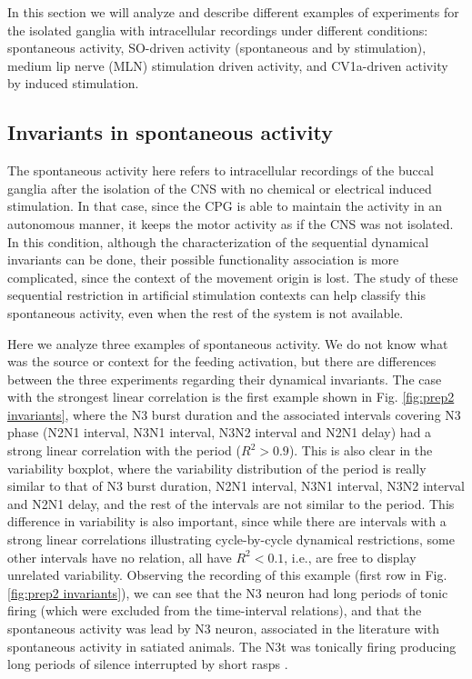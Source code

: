 
In this section we will analyze and describe different examples of experiments for the isolated ganglia with intracellular recordings under different conditions: spontaneous activity, SO-driven activity (spontaneous and by stimulation), medium lip nerve (MLN) stimulation driven activity, and CV1a-driven activity by induced stimulation.

\subsection{Invariants in spontaneous activity}
The spontaneous activity here refers to intracellular recordings of the buccal ganglia after the isolation of the CNS with no chemical or electrical induced stimulation. In that case, since the CPG is able to maintain the activity in an autonomous manner, it keeps the motor activity as if the CNS was not isolated. In this condition, although the characterization of the sequential dynamical invariants can be done, their possible functionality association is more complicated, since the context of the movement origin is lost. The study of these sequential restriction in artificial stimulation contexts can help classify this spontaneous activity, even when the rest of the system is not available. 

Here we analyze three examples of spontaneous activity. We do not know what was the source or context for the feeding activation, but there are differences between the three experiments regarding their dynamical invariants. The case with the strongest linear correlation is the first example shown in Fig. \ref{fig:prep2 invariants}, where the N3 burst duration and the associated intervals covering N3 phase (N2N1 interval, N3N1 interval, N3N2 interval and N2N1 delay) had a strong linear correlation with the period ($R^2 > 0.9$). This is also clear in the variability boxplot, where the variability distribution of the period is really similar to that of N3 burst duration, N2N1 interval, N3N1 interval, N3N2 interval and N2N1 delay, and the rest of the intervals are not similar to the period. This difference in variability is also important, since while there are intervals with a strong linear correlations illustrating cycle-by-cycle dynamical restrictions, some other intervals have no relation, all have $R^2 < 0.1$, i.e., are free to display unrelated variability. Observing the recording of this example (first row in Fig. \ref{fig:prep2 invariants}), we can see that the N3 neuron had long periods of tonic firing (which were excluded from the time-interval relations), and that the spontaneous activity was lead by N3 neuron, associated in the literature with spontaneous activity in satiated animals. The N3t was tonically firing producing long periods of silence interrupted by short rasps \parencite{staras_loss_2003,benjamin_distributed_2012}.

